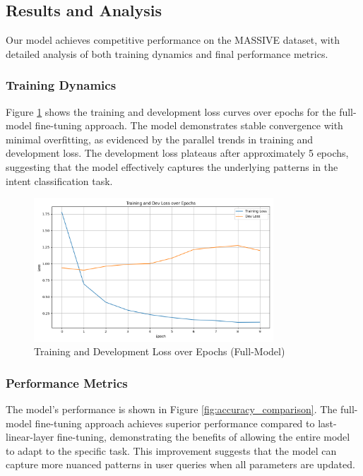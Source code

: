 \documentclass{article}
\begin{document}
\subsection{Results and Analysis}
Our model achieves competitive performance on the MASSIVE dataset, with detailed analysis of both training dynamics and final performance metrics.

\subsubsection{Training Dynamics}
Figure \ref{fig:training_dynamics} shows the training and development loss curves over epochs for the full-model fine-tuning approach. The model demonstrates stable convergence with minimal overfitting, as evidenced by the parallel trends in training and development loss. The development loss plateaus after approximately 5 epochs, suggesting that the model effectively captures the underlying patterns in the intent classification task.

\begin{figure}[h]
\centering
\includegraphics[width=0.8\textwidth]{full-model/loss_metrics.png}
\caption{Training and Development Loss over Epochs (Full-Model)}
\label{fig:training_dynamics}
\end{figure}

\subsubsection{Performance Metrics}
The model's performance is shown in Figure \ref{fig:accuracy_comparison}. The full-model fine-tuning approach achieves superior performance compared to last-linear-layer fine-tuning, demonstrating the benefits of allowing the entire model to adapt to the specific task. This improvement suggests that the model can capture more nuanced patterns in user queries when all parameters are updated.
\end{document}
